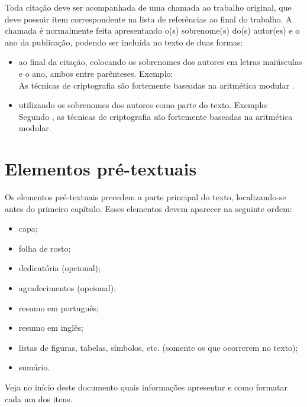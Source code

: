 \documentclass{ifsultcc}
\begin{document}
Toda citação deve ser acompanhada de uma chamada ao trabalho original, que deve possuir item correspondente na lista de referências ao final do trabalho.  A chamada é normalmente feita apresentando o(s) sobrenome(s) do(s) autor(es) e o ano da publicação, podendo ser incluída no texto de duas formas: 
\begin{itemize}
	\item ao final da citação, colocando os sobrenomes dos autores em letras maiúsculas e o ano, ambos entre parênteses.  Exemplo:\\[2ex]
	As técnicas de criptografia são fortemente baseadas na aritmética modular \cite{Stallings14}.
	\item utilizando os sobrenomes dos autores como parte do texto.  Exemplo:\\[2ex]
	Segundo \citet*{Stallings14}, as técnicas de criptografia são fortemente baseadas na aritmética modular.
\end{itemize}

\section{Elementos pré-textuais}
Os elementos pré-textuais precedem a parte principal do texto, localizando-se antes do primeiro capítulo.  Esses elementos devem aparecer na seguinte ordem:
\begin{itemize}
	\item capa;
	\item folha de rosto;
	\item dedicatória (opcional);
	\item agradecimentos (opcional);
	\item resumo em português;
	\item resumo em inglês;
	\item listas de figuras, tabelas, símbolos, etc. (somente os que ocorrerem  no texto);
	\item sumário.
\end{itemize}

Veja no início deste documento quais informações apresentar e como formatar cada um dos itens.


\end{document}
